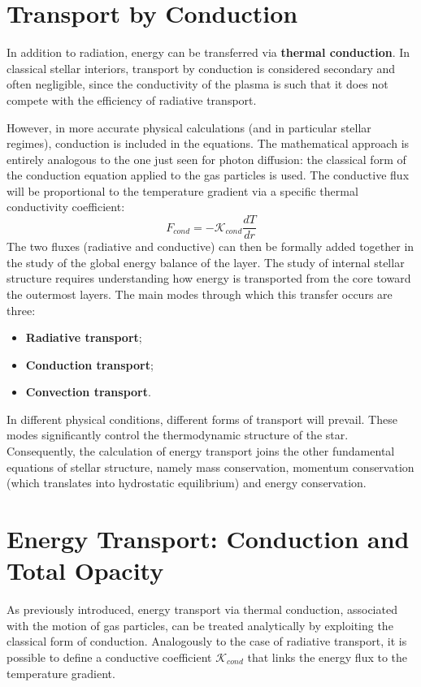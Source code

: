 \section{Transport by Conduction}

In addition to radiation, energy can be transferred via \textbf{thermal conduction}.
In classical stellar interiors, transport by conduction is considered secondary and often negligible, since the conductivity of the plasma is such that it does not compete with the efficiency of radiative transport.

However, in more accurate physical calculations (and in particular stellar regimes), conduction is included in the equations. The mathematical approach is entirely analogous to the one just seen for photon diffusion: the classical form of the conduction equation applied to the gas particles is used. The conductive flux will be proportional to the temperature gradient via a specific thermal conductivity coefficient:
\begin{equation}
F_{cond} = - \mathcal{K}_{cond} \frac{dT}{dr}
\end{equation}
The two fluxes (radiative and conductive) can then be formally added together in the study of the global energy balance of the layer.
The study of internal stellar structure requires understanding how energy is transported from the core toward the outermost layers. The main modes through which this transfer occurs are three:
\begin{itemize}
\item \textbf{Radiative transport};
\item \textbf{Conduction transport};
\item \textbf{Convection transport}.
\end{itemize}
In different physical conditions, different forms of transport will prevail. These modes significantly control the thermodynamic structure of the star. Consequently, the calculation of energy transport joins the other fundamental equations of stellar structure, namely mass conservation, momentum conservation (which translates into hydrostatic equilibrium) and energy conservation.

\section{Energy Transport: Conduction and Total Opacity}

As previously introduced, energy transport via thermal conduction, associated with the motion of gas particles, can be treated analytically by exploiting the classical form of conduction. Analogously to the case of radiative transport, it is possible to define a conductive coefficient $\mathcal{K}_{cond}$ that links the energy flux to the temperature gradient.

